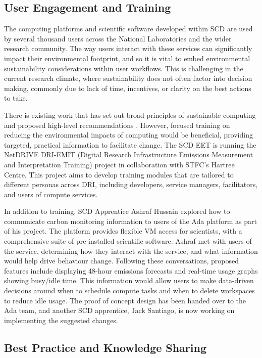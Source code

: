 \documentclass[sigconf]{acmart}
\begin{document}
\subsection{User Engagement and Training}

The computing platforms and scientific software developed within SCD are used by several thousand users across the National Laboratories and the wider research community. The way users interact with these services can significantly impact their environmental footprint, and so it is vital to embed environmental sustainability considerations within user workflows. This is challenging in the current research climate, where sustainability does not often factor into decision making, commonly due to lack of time, incentives, or clarity on the best actions to take.

There is existing work that has set out broad principles of sustainable computing and proposed high-level recommendations \cite{DRINetZeroScopingReport, LannelongueGREENER}. However, focused training on reducing the environmental impacts of computing would be beneficial, providing targeted, practical information to facilitate change. The SCD EET is running the NetDRIVE DRI-EMIT (Digital Research Infrastructure Emissions Measurement and Interpretation Training) project in collaboration with STFC's Hartree Centre. This project aims to develop training modules that are tailored to different personas across DRI, including developers, service managers, facilitators, and users of compute services.

In addition to training, SCD Apprentice Ashraf Hussain explored how to communicate carbon monitoring information to users of the Ada platform as part of his project. The platform provides flexible VM access for scientists, with a comprehensive suite of pre-installed scientific software. Ashraf met with users of the service, determining how they interact with the service, and what information would help drive behaviour change. Following these conversations, proposed features include displaying 48-hour emissions forecasts and real-time usage graphs showing busy/idle time. This information would allow users to make data-driven decisions around when to schedule compute tasks and when to delete workspaces to reduce idle usage. The proof of concept design has been handed over to the Ada team, and another SCD apprentice, Jack Santiago, is now working on implementing the suggested changes.

\subsection{Best Practice and Knowledge Sharing}
\end{document}
